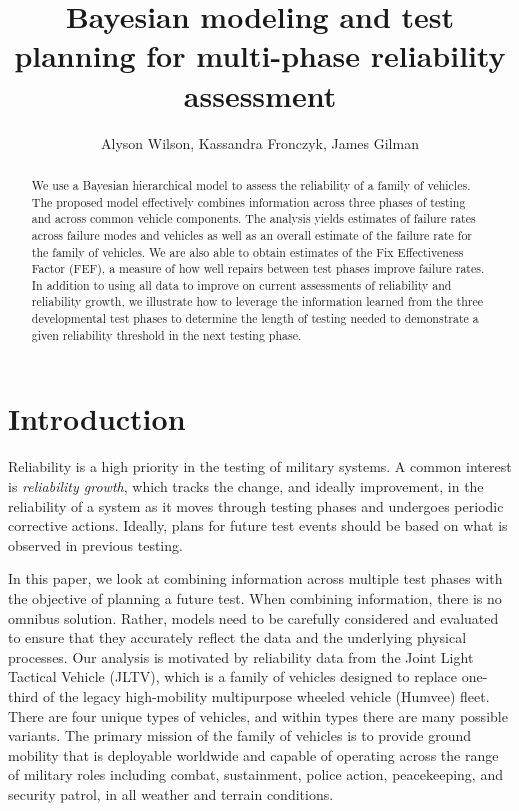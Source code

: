 \documentclass[12pt]{article}
\title{Bayesian modeling and test planning for multi-phase reliability assessment}
\author{Alyson Wilson,  Kassandra Fronczyk, James Gilman}
\begin{document}
\maketitle

\begin{abstract}
We use a Bayesian hierarchical model to assess the reliability of a family of
vehicles. The proposed model effectively combines information across three
phases of testing and across common vehicle components. The analysis yields
estimates of failure rates across failure modes and vehicles as well as an overall
estimate of the failure rate for the family of vehicles. We are also able to
obtain estimates of the Fix Effectiveness Factor (FEF), a measure of how well
repairs between test phases improve failure rates. In addition to using all data
to improve on current assessments of reliability and reliability growth, we
illustrate how to leverage the information learned from the three developmental
test phases to determine the length of testing needed to demonstrate a given
reliability threshold in the next testing phase.
\end{abstract}

\section{Introduction}
Reliability is a high priority in the testing of military systems. A common
interest is {\em reliability growth}, which tracks the change, and ideally
improvement, in the reliability of a system as it moves through testing phases
and undergoes periodic corrective actions. Ideally, plans for future test events
should be based on what is observed in previous testing.

In this paper, we look at combining information across multiple test phases with
the objective of planning a future test. When combining information, there is no
omnibus solution. Rather, models need to be carefully considered and evaluated
to ensure that they accurately reflect the data and the underlying physical
processes. Our analysis is motivated by reliability data from the Joint Light
Tactical Vehicle (JLTV), which is a family of vehicles designed to replace
one-third of the legacy high-mobility multipurpose wheeled vehicle (Humvee)
fleet. There are four unique types of vehicles, and within types there are many
possible variants. The primary mission of the family of vehicles is to provide
ground mobility that is deployable worldwide and capable of operating across the
range of military roles including combat, sustainment, police action,
peacekeeping, and security patrol, in all weather and terrain conditions.
\end{document}
